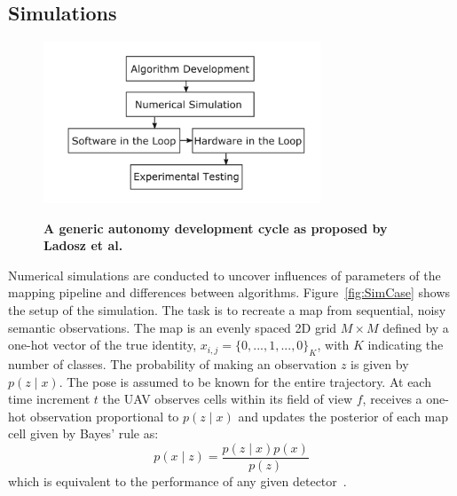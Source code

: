 \documentclass[twocolumn,letterpaper]{IEEEAerospaceCLS}  %
\begin{document}
\subsection{Simulations} \label{ssec:MetSim}
\begin{figure}[h!]
    \centering
    \includegraphics[width=3.25in]{2-3DevelopmentCycle.png}\\
    \caption{\bf{A generic autonomy development cycle as proposed by Ladosz et al.~\protect\cite{ladosz_generic_2019}}}
    \label{fig:DevProcess}
\end{figure}
Numerical simulations are conducted to uncover influences of parameters of the mapping pipeline and differences between algorithms. Figure~\ref{fig:SimCase} shows the setup of the simulation. The task is to recreate a map from sequential, noisy semantic observations. The map is an evenly spaced 2D grid $M \times M$ defined by a one-hot vector of the true identity, $x_{i,j} = \{0,..., 1, ..., 0\}_K$, with $K$ indicating the number of classes. The probability of making an observation $z$ is given by $p(z\mid x)$. The pose is assumed to be known for the entire trajectory. At each time increment $t$ the UAV observes cells within its field of view $f$, receives a one-hot observation proportional to $p(z\mid x)$ and updates the posterior of each map cell given by Bayes' rule as:
\begin{equation} \label{eq:Bayes}
    p(x\mid z) = \frac{p(z\mid x) p(x)}{p(z)}
\end{equation}
which is equivalent to the performance of any given detector~\cite{alom_history_2018}.
\end{document}
